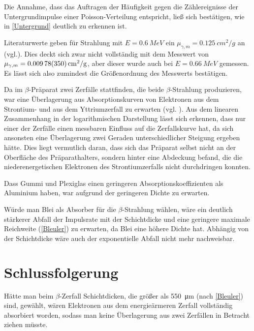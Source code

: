 \documentclass[
	a4paper,
	12pt,
	pagesize,
	ngerman
]{scrartcl}
\begin{document}
	Die Annahme, dass das Auftragen der Häufigkeit gegen die Zählereignisse der Untergrundimpulse einer Poisson-Verteilung entspricht, ließ sich bestätigen, wie in \cref{Untergrund} deutlich zu erkennen ist.
	
	Literaturwerte geben für Strahlung mit $E=\SI{0,6}{MeV}$ ein $\mu_{\gamma,m} = \SI{0,125}{cm^2/g}$ an (vgl.\cite{absorption_blei}).
	Dies deckt sich zwar nicht vollständig mit dem Messwert von $\mu_{\gamma,m} = \SI{0,00978 \pm 0,0035}{cm^2/g}$, aber dieser wurde auch bei $E=\SI{0,66}{MeV}$ gemessen.
	Es lässt sich also zumindest die Größenordnung des Messwerts bestätigen.
	
	Da im $\beta$-Präparat zwei Zerfälle stattfinden, die beide $\beta$-Strahlung produzieren, war eine Überlagerung aus Absorptionskurven von Elektronen aus dem Strontium- und aus dem Yttriumzerfall zu erwarten (vgl. \cite{Einfuehrung}).
	Aus dem linearen Zusammenhang in der logarithmischen Darstellung lässt sich erkennen, dass nur einer der Zerfälle einen messbaren Einfluss auf die Zerfallskurve hat, da sich ansonsten eine Überlagerung zwei Geraden unterschiedlicher Steigung ergeben hätte.
	Dies liegt vermutlich daran, dass sich das Präparat selbst nicht an der Oberfläche des Präparathalters, sondern hinter eine Abdeckung befand, die die niederenergetischen Elektronen des Strontiumzerfalls nicht durchdringen konnten.
	
	Dass Gummi und Plexiglas einen geringeren Absorptionskoeffizienten als Aluminium haben, war aufgrund der geringeren Dichte zu erwarten.
	\par
	Würde man Blei als Absorber für die $\beta$-Strahlung wählen, wäre ein deutlich stärkerer Abfall der Impulsrate mit der Schichtdicke und eine geringere maximale Reichweite (\cref{Bleuler}) zu erwarten, da Blei eine höhere Dichte hat.
	Abhängig von der Schichtdicke wäre auch der exponentielle Abfall nicht mehr nachweisbar.
	
	\section{Schlussfolgerung}
	
	
	Hätte man beim $\beta$-Zerfall Schichtdicken, die größer als \SI{550}{\micro \meter} (nach \cref{Bleuler}) sind, gewählt, wären Elektronen aus dem energieärmeren Zerfall vollständig absorbiert worden, sodass man keine Überlagerung aus zwei Zerfällen in Betracht ziehen müsste.
	\printbibliography
\end{document}
